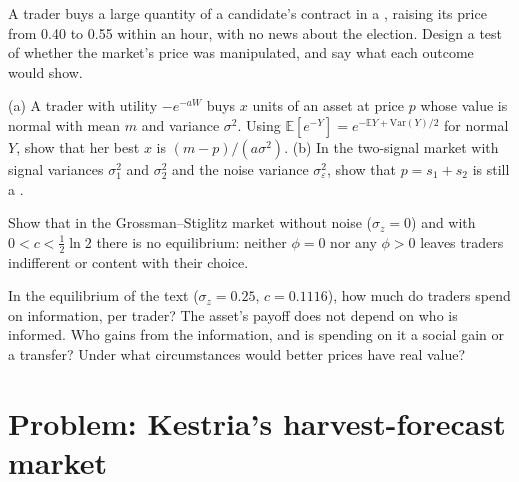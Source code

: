 \begin{exercise}[$\star\star$]\label{exo:b2:prices-as-information:9}
A trader buys a large quantity of a candidate's contract in a , raising its price from
0.40 to 0.55 within an hour, with no news about the election. Design a test of whether the market's price
was manipulated, and say what each outcome would show.
\end{exercise}

\begin{exercise}[$\star\star\star$]\label{exo:b2:prices-as-information:10}
(a) A trader with utility $-e^{-aW}$ buys $x$ units of an asset at price $p$ whose value is normal with mean
$m$ and variance $\sigma^2$. Using $\mathbb{E}[e^{-Y}] = e^{-\mathbb{E}Y + \mathrm{Var}(Y)/2}$ for normal $Y$, show
that her best $x$ is $(m - p)/(a\sigma^2)$. (b) In the two-signal market with signal variances $\sigma_1^2$ and
$\sigma_2^2$ and the noise variance $\sigma_\varepsilon^2$, show that $p = s_1 + s_2$ is still a .
\end{exercise}

\begin{exercise}[$\star\star\star$]\label{exo:b2:prices-as-information:11}
Show that in the Grossman--Stiglitz market without noise ($\sigma_z = 0$) and with $0 < c < \tfrac12\ln 2$
there is no equilibrium: neither $\phi = 0$ nor any $\phi > 0$ leaves traders indifferent or content with
their choice.
\end{exercise}

\begin{exercise}[$\star\star\star$]\label{exo:b2:prices-as-information:12}
In the equilibrium of the text ($\sigma_z = 0.25$, $c = 0.1116$), how much do traders spend on
information, per trader? The asset's payoff does not depend on who is informed. Who gains from the
information, and is spending on it a social gain or a transfer? Under what circumstances would better
prices have real value?
\end{exercise}

\section{Problem: Kestria's harvest-forecast market}\label{sec:b2:prices-as-information:problem}

